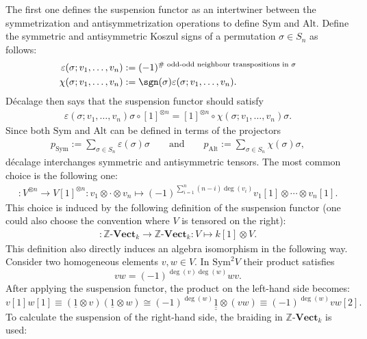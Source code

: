 \begin{remark}
        The first one defines the suspension functor as an intertwiner between the symmetrization and antisymmetrization operations to define $\text{Sym}$ and $\text{Alt}$. Define the symmetric and antisymmetric Koszul signs of a permutation $\sigma\in S_n$ as follows:
        \begin{align}
            \varepsilon(\sigma;v_1,\ldots,v_n) &:= (-1)^{\#\text{ odd-odd neighbour transpositions in }\sigma}\\
            \chi(\sigma;v_1,\ldots,v_n) &:= \sgn(\sigma)\varepsilon(\sigma;v_1,\ldots,v_n).
        \end{align}
        D\'ecalage then says that the suspension functor should satisfy
        \begin{gather}
            \varepsilon(\sigma;v_1,\ldots,v_n)\sigma\circ[1]^{\otimes n} = [1]^{\otimes n}\circ\chi(\sigma;v_1,\ldots,v_n)\sigma.
        \end{gather}
        Since both $\text{Sym}$ and $\text{Alt}$ can be defined in terms of the projectors
        \begin{gather}
            p_{\text{Sym}}:=\sum_{\sigma\in S_n}\varepsilon(\sigma)\sigma\qquad\text{and}\qquad p_{\text{Alt}}:=\sum_{\sigma\in S_n}\chi(\sigma)\sigma,
        \end{gather}
        d\'ecalage interchanges symmetric and antisymmetric tensors. The most common choice is the following one:
        \begin{gather}
            [1]:V^{\otimes n}\rightarrow V[1]^{\otimes n}:v_1\otimes\cdot\otimes v_n\mapsto(-1)^{\sum_{i=1}^n(n-i)\deg(v_i)}v_1[1]\otimes\cdots\otimes v_n[1].
        \end{gather}
        This choice is induced by the following definition of the suspension functor (one could also choose the convention where $V$ is tensored on the right):
        \begin{gather}
            [1]:\mathbb{Z}\text{-}\mathbf{Vect}_k\rightarrow\mathbb{Z}\text{-}\mathbf{Vect}_k:V\mapsto k[1]\otimes V.
        \end{gather}
        This definition also directly induces an algebra isomorphism in the following way. Consider two homogeneous elements $v,w\in V$. In $\text{Sym}^2V$ their product satisfies \[vw = (-1)^{\deg(v)\deg(w)}wv.\] After applying the suspension functor, the product on the left-hand side becomes: \[v[1]w[1]\equiv(\underline{1}\otimes v)(\underline{1}\otimes w) \cong (-1)^{\deg(w)}\underline{\underline{1}}\otimes(vw)\equiv(-1)^{\deg(w)}vw[2].\] To calculate the suspension of the right-hand side, the braiding in $\mathbb{Z}\text{-}\mathbf{Vect}_k$ is used:

\end{remark}

